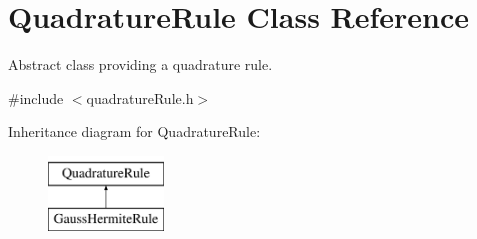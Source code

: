 \hypertarget{classQuadratureRule}{\section{Quadrature\-Rule Class Reference}
\label{classQuadratureRule}
}


Abstract class providing a quadrature rule.  




{\ttfamily \#include $<$quadrature\-Rule.\-h$>$}

Inheritance diagram for Quadrature\-Rule\-:\begin{figure}[H]
\begin{center}
\leavevmode
\includegraphics[height=2.000000cm]{classQuadratureRule}
\end{center}
\end{figure}
